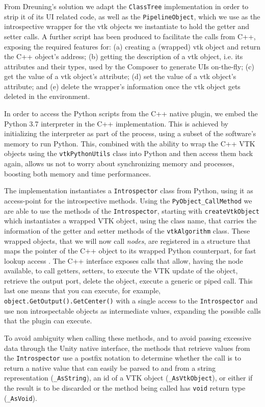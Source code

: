 From Dreuning's solution we adapt the \verb|ClassTree| implementation in order to strip it of its UI related code, as well as the \verb|PipelineObject|, which we use as the introspective wrapper for the \acrshort{vtk} objects we instantiate to hold the getter and setter calls. A further script has been produced to facilitate the calls from C++, exposing the required features for: (a) creating a (wrapped) \acrshort{vtk} object and return the C++ object's address; (b) getting the description of a \acrshort{vtk} object, i.e. its attributes and their types, used by the Composer to generate UIs on-the-fly; (c) get the value of a \acrshort{vtk} object's attribute; (d) set the value of a \acrshort{vtk} object's attribute; and (e) delete the wrapper's information once the \acrshort{vtk} object gets deleted in the environment. 

In order to access the Python scripts from the C++ native plugin, we embed the Python 3.7 interpreter in the C++ implementation. This is achieved by initializing the interpreter as part of the process, using a subset of the software's memory to run Python. This, combined with the ability to wrap the C++ VTK objects using the \verb|vtkPythonUtils| class into Python and then access them back again, allows us not to worry about synchronizing memory and processes, boosting both memory and time performances.

The implementation instantiates a \verb|Introspector| class from Python, using it as access-point for the introspective methods. Using the \verb|PyObject_CallMethod| we are able to use the methods of the \verb|Introspector|, starting with \verb|createVtkObject| which instantiates a wrapped VTK object, using the class name, that carries the information of the getter and setter methods of the \verb|vtkAlgorithm| class. These wrapped objects, that we will now call \textit{nodes}, are registered in a structure that maps the pointer of the C++ object to its wrapped Python counterpart, for fast lookup access \cite{stdunord16}. The C++ interface exposes calls that allow, having the node available, to call getters, setters, to execute the VTK update of the object, retrieve the output port, delete the object, execute a generic or piped call. This last one means that you can execute, for example, \verb|object.GetOutput().GetCenter()| with a single access to the \verb|Introspector| and use non introspectable objects as intermediate values, expanding the possible calls that the plugin can execute.

To avoid ambiguity when calling these methods, and to avoid passing excessive data through the Unity native interface, the methods that retrieve values from the \verb|Introspector| use a postfix notation to determine whether the call is to return a native value that can easily be parsed to and from a string representation (\verb|_AsString|), an id of a VTK object (\verb|_AsVtkObject|), or either if the result is to be discarded or the method being called has \verb|void| return type (\verb|_AsVoid|).

